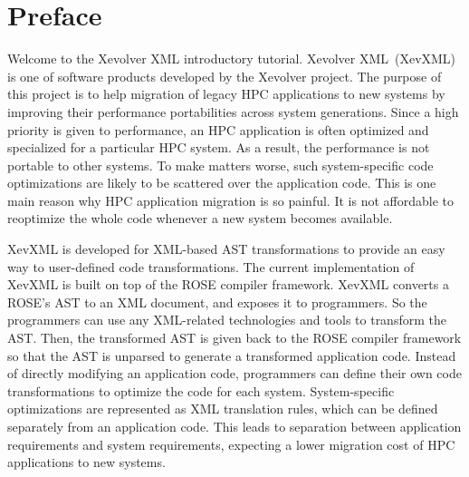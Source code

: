 
\chapter*{Preface}



Welcome to the Xevolver XML introductory tutorial.  Xevolver
XML~(XevXML) is one of software products developed by the Xevolver
project.  The purpose of this project is to help migration of legacy HPC
applications to new systems by improving their performance portabilities
across system generations.  Since a high priority is given to
performance, an HPC application is often optimized and specialized for a
particular HPC system. As a result, the performance is not portable to
other systems.  To make matters worse, such system-specific code
optimizations are likely to be scattered over the application code. This
is one main reason why HPC application migration is so painful. It is
not affordable to reoptimize the whole code whenever a new system
becomes available.



XevXML is developed for XML-based AST transformations to provide an easy
way to user-defined code transformations.  The current implementation of
XevXML is built on top of the ROSE compiler framework. XevXML converts a
ROSE's AST to an XML document, and exposes it to programmers. So the
programmers can use any XML-related technologies and tools to transform
the AST. Then, the transformed AST is given back to the ROSE compiler
framework so that the AST is unparsed to generate a transformed
application code.  Instead of directly modifying an application code,
programmers can define their own code transformations to optimize the
code for each system.  System-specific optimizations are represented as
XML translation rules, which can be defined separately from an
application code.  This leads to separation between application
requirements and system requirements, expecting a lower migration cost
of HPC applications to new systems.
